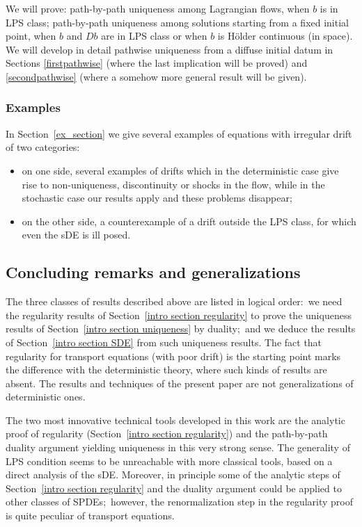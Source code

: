 \documentclass[a4paper,10pt]{article}
\begin{document}
We will prove: path-by-path uniqueness among Lagrangian flows, when $b$ is in LPS class; path-by-path uniqueness among solutions starting from a fixed initial point, when $b$ and $Db$ are in LPS class or when $b$ is H\"older continuous (in space). We will develop in detail pathwise uniqueness from a diffuse initial datum in Sections \ref{firstpathwise} (where the last implication will be proved) and \ref{secondpathwise} (where a somehow more general result will be given).

\subsubsection{Examples}

In Section~\ref{ex_section} we give several examples of equations with irregular drift of two categories:
\begin{itemize}
\item[i)] on one side, several examples of drifts which in the deterministic case give rise to non-uniqueness, discontinuity or shocks in the flow, while in the stochastic case our results apply and these problems disappear;
\item[ii)] on the other side, a counterexample of a drift outside the LPS class, for which even the sDE is ill posed.
\end{itemize}

\subsection{Concluding remarks and generalizations}\label{general}

The three classes of results described above are listed in logical order:\
we need the regularity results of Section~\ref{intro section regularity} to
prove the uniqueness results of Section~\ref{intro section uniqueness} by
duality;\ and we deduce the results of Section~\ref{intro section SDE} from
such uniqueness results. The fact that regularity for transport equations
(with poor drift) is the starting point marks the difference with the
deterministic theory, where such kinds of results are absent. The results
and techniques of the present paper are not generalizations of deterministic
ones.

The two most innovative technical tools developed in this work are the
analytic proof of regularity (Section~\ref{intro section regularity}) and
the path-by-path duality argument yielding uniqueness in this very strong
sense. The generality of LPS condition seems to be unreachable with more
classical tools, based on a direct analysis of the sDE. Moreover, in
principle some of the analytic steps of Section~\ref{intro section
regularity} and the duality argument could be applied to other classes of
SPDEs;\ however, the renormalization step in the regularity proof is quite
peculiar of transport equations.
\end{document}
